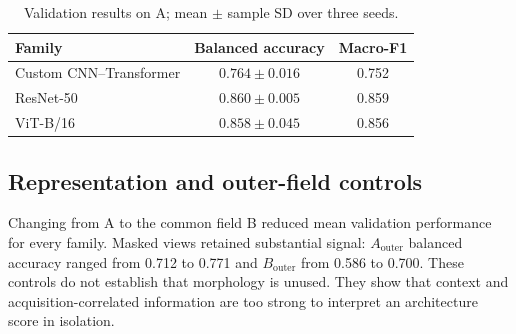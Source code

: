 \documentclass[preprint,12pt,authoryear]{elsarticle}
\newcommand{\balacc}{balanced accuracy}
\begin{document}
\begin{table}[t]
\centering
\caption{Validation results on A; mean $\pm$ sample SD over three seeds.}
\label{tab:valA}
\begin{tabular}{lcc}
\toprule
Family & Balanced accuracy & Macro-F1 \\
\midrule
Custom CNN--Transformer & $0.764\pm0.016$ & 0.752 \\
ResNet-50               & $0.860\pm0.005$ & 0.859 \\
ViT-B/16                & $0.858\pm0.045$ & 0.856 \\
\bottomrule
\end{tabular}
\end{table}

\subsection{Representation and outer-field controls}

Changing from A to the common field B reduced mean validation performance for every
family. Masked views retained substantial signal: $A_{\mathrm{outer}}$ \balacc{}
ranged from 0.712 to 0.771 and $B_{\mathrm{outer}}$ from 0.586 to 0.700. These
controls do not establish that morphology is unused. They show that context and
acquisition-correlated information are too strong to interpret an architecture score
in isolation.

\begin{table}[t]
\centering
\caption{Validation controls; mean $\pm$ sample SD over three fixed seeds.}
\label{tab:controls}
\end{table}
\end{document}
